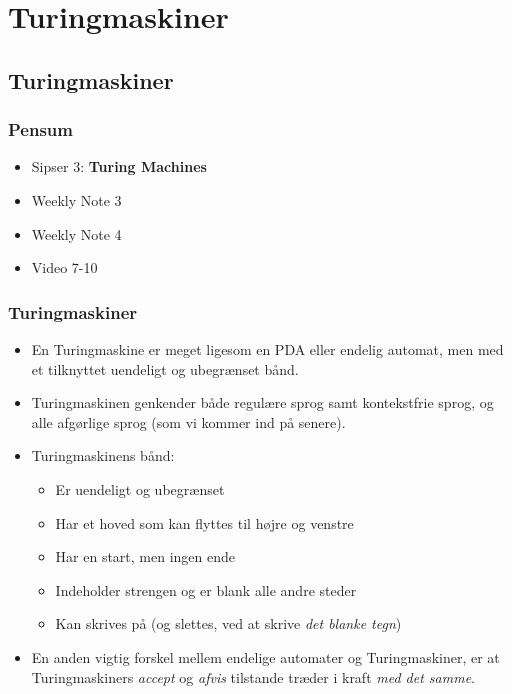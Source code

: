 
\section{Turingmaskiner}%
\label{sec:turingmachines}

\subsection{Turingmaskiner}%
\label{subsec:label}



\begin{frame}
  \frametitle{Pensum}
  \begin{itemize}
    \item Sipser 3: \textbf{Turing Machines}
    \item Weekly Note 3
    \item Weekly Note 4
    \item Video 7-10
  \end{itemize}
\end{frame}

\begin{frame}[allowframebreaks]
  \frametitle{Turingmaskiner}
        \begin{itemize}
          \item En Turingmaskine er meget ligesom en PDA eller endelig automat, men med et tilknyttet uendeligt og ubegrænset bånd.
          \item Turingmaskinen genkender både regulære sprog samt kontekstfrie sprog, og alle afgørlige sprog (som vi kommer ind på senere).
          \item Turingmaskinens bånd:
                \begin{itemize}
                  \item Er uendeligt og ubegrænset
                  \item Har et hoved som kan flyttes til højre og venstre
                  \item Har en start, men ingen ende
                  \item Indeholder strengen og er blank alle andre steder
                  \item Kan skrives på (og slettes, ved at skrive \textit{det blanke tegn})
                \end{itemize}
          \item En anden vigtig forskel mellem endelige automater og Turingmaskiner, er at Turingmaskiners \textit{accept} og \textit{afvis} tilstande træder i kraft \textit{med det samme}.
        \end{itemize}
\end{frame}

